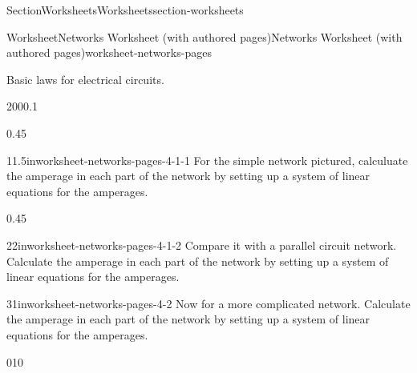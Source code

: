 \documentclass[oneside,10pt,]{article}
\numberwithin{equation}{section}
\begin{document}
\begin{sectionptx}{Section}{Worksheets}{}{Worksheets}{}{}{section-worksheets}
\begin{worksheet-subsection}{Worksheet}{Networks Worksheet (with authored pages)}{}{Networks Worksheet (with authored pages)}{}{}{worksheet-networks-pages}
\begin{introduction}{Basic laws for electrical circuits.}
\end{introduction}%
\clearpage
\begin{sidebyside}{2}{0}{0}{0.1}%
\begin{sbspanel}{0.45}%
\begin{divisionexercise}{1}{}{1.5in}{worksheet-networks-pages-4-1-1}%
For the simple network pictured, calculuate the amperage in each part of the network by setting up a system of linear equations for the amperages.%
\noindent{}%
\end{divisionexercise}%
\end{sbspanel}%
\begin{sbspanel}{0.45}%
\begin{divisionexercise}{2}{}{2in}{worksheet-networks-pages-4-1-2}%
Compare it with a parallel circuit network. Calculate the amperage in each part of the network by setting up a system of linear equations for the amperages.%
\noindent{}%
\end{divisionexercise}%
\end{sbspanel}%
\end{sidebyside}%
\begin{divisionexercise}{3}{}{1in}{worksheet-networks-pages-4-2}%
Now for a more complicated network. Calculate the amperage in each part of the network by setting up a system of linear equations for the amperages.%
\begin{image}{0}{1}{0}{}%
\end{image}
\end{divisionexercise}
\end{worksheet-subsection}
\end{sectionptx}
\end{document}
